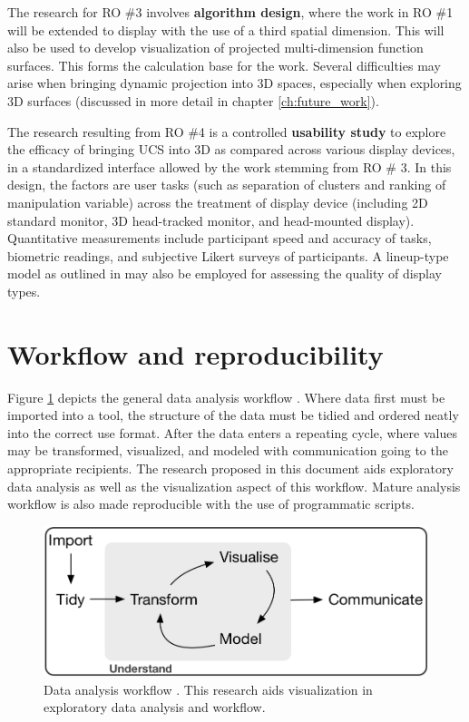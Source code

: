 \documentclass{monashthesis}
\begin{document}
The research for RO \#3 involves \textbf{algorithm design}, where the work in RO \#1 will be extended to display with the use of a third spatial dimension. This will also be used to develop visualization of projected multi-dimension function surfaces. This forms the calculation base for the work. Several difficulties may arise when bringing dynamic projection into 3D spaces, especially when exploring 3D surfaces (discussed in more detail in chapter \ref{ch:future_work}).

The research resulting from RO \#4 is a controlled \textbf{usability study} to explore the efficacy of bringing UCS into 3D as compared across various display devices, in a standardized interface allowed by the work stemming from RO \# 3. In this design, the factors are user tasks (such as separation of clusters and ranking of manipulation variable) across the treatment of display device (including 2D standard monitor, 3D head-tracked monitor, and head-mounted display). Quantitative measurements include participant speed and accuracy of tasks, biometric readings, and subjective Likert surveys of participants. A lineup-type model as outlined in \textcite{hofmann_graphical_2012} may also be employed for assessing the quality of display types.

\hypertarget{workflow-and-reproducibility}{%
\section{Workflow and reproducibility}\label{workflow-and-reproducibility}}

Figure \ref{fig:dataanalysisworkflow} depicts the general data analysis workflow \autocite{wickham_r_2016}. Where data first must be imported into a tool, the structure of the data must be tidied and ordered neatly into the correct use format. After the data enters a repeating cycle, where values may be transformed, visualized, and modeled with communication going to the appropriate recipients. The research proposed in this document aids exploratory data analysis as well as the visualization aspect of this workflow. Mature analysis workflow is also made reproducible with the use of programmatic scripts.



\begin{figure}

{\centering \includegraphics[width=1\linewidth]{./figures/data_analysis_workflow} 

}

\caption{Data analysis workflow \autocite{wickham_r_2016}. This research aids visualization in exploratory data analysis and workflow.}\label{fig:dataanalysisworkflow}
\end{figure}
\end{document}
